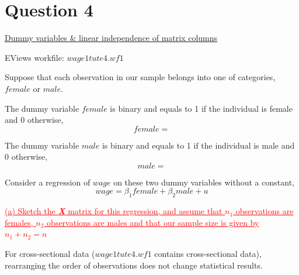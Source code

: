 \documentclass[12pt]{report}
\begin{document}
\newpage
\section*{Question 4}
\noindent \underline{Dummy variables \& linear independence of matrix columns}

\noindent EViews workfile: $wage1tute4.wf1$

\noindent Suppose that each observation in our sample belongs into one of categories, $female$ or $male$. 

\noindent The dummy variable $female$ is binary and equals to 1 if the individual is female and 0 otherwise, 
$$female =  $$

\noindent The dummy variable $male$ is binary and equals to 1 if the individual is male and 0 otherwise, 
$$male =  $$

\noindent Consider a regression of $wage$ on these two dummy variables without a constant,
$$wage = \beta_1female + \beta_2male + u$$

\noindent \textcolor{red}
{
	\ul{(a) Sketch the \textbf{\textit{X}} matrix for this regression, and assume that $n_1$ observations are females, $n_2$ observations are males and that our sample size is given by $n_1+n_2=n$}
}

\noindent For cross-sectional data ($wage1tute4.wf1$ contains cross-sectional data), rearranging the order of observations  does not change statistical results.
\end{document}
